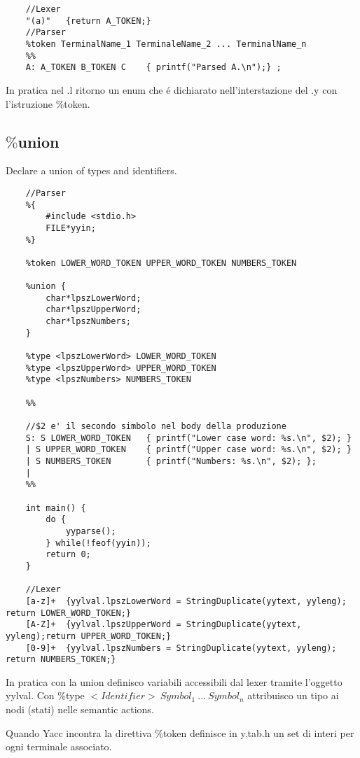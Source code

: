 \begin{lstlisting}
    //Lexer
    "(a)"	{return A_TOKEN;}
    //Parser
    %token TerminalName_1 TerminaleName_2 ... TerminalName_n
    %%
    A: A_TOKEN B_TOKEN C	{ printf("Parsed A.\n");} ;
\end{lstlisting}

In pratica nel .l ritorno un enum che \'e dichiarato nell'interstazione del .y con l'istruzione $\%$token.

\subsection{$\%$union}

Declare a union of types and identifiers.

\begin{lstlisting}
    //Parser
    %{
        #include <stdio.h>
        FILE*yyin;
    %}

    %token LOWER_WORD_TOKEN UPPER_WORD_TOKEN NUMBERS_TOKEN

    %union {
        char*lpszLowerWord;
        char*lpszUpperWord;
        char*lpszNumbers;
    }

    %type <lpszLowerWord> LOWER_WORD_TOKEN
    %type <lpszUpperWord> UPPER_WORD_TOKEN
    %type <lpszNumbers> NUMBERS_TOKEN

    %%

    //$2 e' il secondo simbolo nel body della produzione
    S: S LOWER_WORD_TOKEN	{ printf("Lower case word: %s.\n", $2); } 
    | S UPPER_WORD_TOKEN	{ printf("Upper case word: %s.\n", $2); }
    | S NUMBERS_TOKEN 		{ printf("Numbers: %s.\n", $2); };
    |
    %%

    int main() {
        do {
            yyparse();
        } while(!feof(yyin));
        return 0;
    }

    //Lexer
    [a-z]+	{yylval.lpszLowerWord = StringDuplicate(yytext, yyleng); return LOWER_WORD_TOKEN;}
    [A-Z]+	{yylval.lpszUpperWord = StringDuplicate(yytext, yyleng);return UPPER_WORD_TOKEN;}
    [0-9]+	{yylval.lpszNumbers = StringDuplicate(yytext, yyleng); return NUMBERS_TOKEN;}
\end{lstlisting}

In pratica con la union definisco variabili accessibili dal lexer tramite l'oggetto yylval.
Con $\%$type $<Identifier>\ Symbol_1\ ...\ Symbol_n$ attribuisco un tipo ai nodi (stati) nelle semantic actions.

Quando Yacc incontra la direttiva $\%$token definisce in y.tab.h un set di interi per ogni terminale associato.

